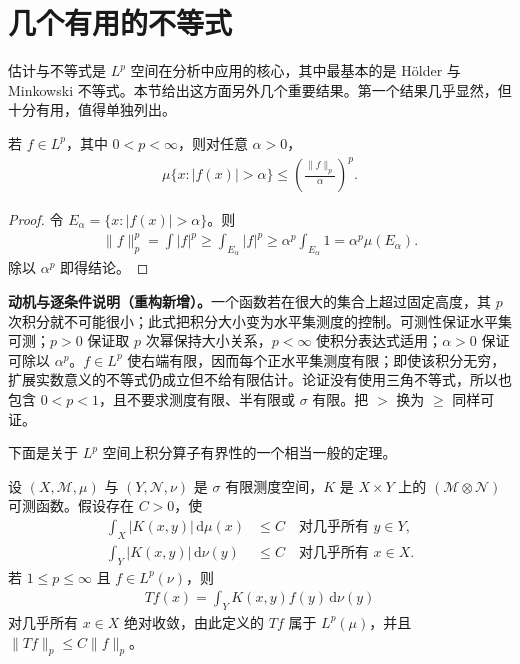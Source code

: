 \documentclass[../../main.tex]{subfiles}
\begin{document}
\section{几个有用的不等式}\label{section:ch06-useful-inequalities}
估计与不等式是 $L^p$ 空间在分析中应用的核心，其中最基本的是 Hölder 与 Minkowski 不等式。本节给出这方面另外几个重要结果。第一个结果几乎显然，但十分有用，值得单独列出。
\begin{theorem}\label{theorem:ch06-chebyshev}
若 $f\in L^p$，其中 $0<p<\infty$，则对任意 $\alpha>0$，
\begin{align*}
\mu\{x:|f(x)|>\alpha\}\leqslant\left(\frac{\|f\|_p}{\alpha}\right)^p.
\end{align*}
\end{theorem}
\begin{proof}
令 $E_\alpha=\{x:|f(x)|>\alpha\}$。则
\begin{align*}
\|f\|_p^p=\int|f|^p\geqslant\int_{E_\alpha}|f|^p
\geqslant\alpha^p\int_{E_\alpha}1=\alpha^p\mu(E_\alpha).
\end{align*}
除以 $\alpha^p$ 即得结论。
\end{proof}
\begin{remark}
\textbf{动机与逐条件说明（重构新增）。}一个函数若在很大的集合上超过固定高度，其 $p$ 次积分就不可能很小；此式把积分大小变为水平集测度的控制。可测性保证水平集可测；$p>0$ 保证取 $p$ 次幂保持大小关系，$p<\infty$ 使积分表达式适用；$\alpha>0$ 保证可除以 $\alpha^p$。$f\in L^p$ 使右端有限，因而每个正水平集测度有限；即使该积分无穷，扩展实数意义的不等式仍成立但不给有限估计。论证没有使用三角不等式，所以也包含 $0<p<1$，且不要求测度有限、半有限或 $\sigma$ 有限。把 $>$ 换为 $\geqslant$ 同样可证。
\end{remark}
下面是关于 $L^p$ 空间上积分算子有界性的一个相当一般的定理。
\begin{theorem}\label{theorem:ch06-kernel-bound}
设 $(X,\mathscr M,\mu)$ 与 $(Y,\mathscr N,\nu)$ 是 $\sigma$ 有限测度空间，$K$ 是 $X\times Y$ 上的 $(\mathscr M\otimes\mathscr N)$ 可测函数。假设存在 $C>0$，使
\begin{align*}
\int_X|K(x,y)|\,\mathrm d\mu(x)&\leqslant C\quad\text{对几乎所有 }y\in Y,\\
\int_Y|K(x,y)|\,\mathrm d\nu(y)&\leqslant C\quad\text{对几乎所有 }x\in X.
\end{align*}
若 $1\leqslant p\leqslant\infty$ 且 $f\in L^p(\nu)$，则
\begin{align*}
Tf(x)=\int_YK(x,y)f(y)\,\mathrm d\nu(y)
\end{align*}
对几乎所有 $x\in X$ 绝对收敛，由此定义的 $Tf$ 属于 $L^p(\mu)$，并且 $\|Tf\|_p\leqslant C\|f\|_p$。
\end{theorem}
\end{document}
